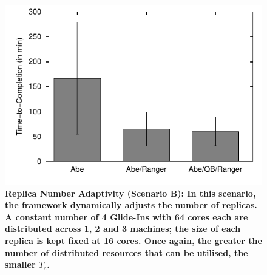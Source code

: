 \documentclass{rspublic}
\begin{document}
\begin{figure}[h]
\begin{minipage}[t]{.485\textwidth}
\begin{center}
      \includegraphics[width=\textwidth]{performance/perf_distributed_number_replica.pdf}
      \caption{\footnotesize \bf Replica Number Adaptivity (Scenario
        B): In this scenario, the framework dynamically adjusts the
        number of replicas.  A constant number of 4 Glide-Ins with 64
        cores each are distributed across 1, 2 and 3 machines; the
        size of each replica is kept fixed at 16 cores. Once again,
        the greater the number of distributed resources that can be
        utilised, the smaller $T_{c}$.}
      \label{fig:performance_perf_distributed_B}
    \end{center}
  \end{minipage}
  \hfill
\end{figure}
\end{document}
